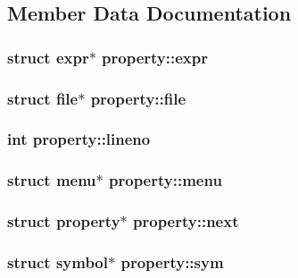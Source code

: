 \subsection{Member Data Documentation}
\hypertarget{structproperty_a1bd14e5a3072108ed7144ee002826295}{
\subsubsection[{expr}]{\setlength{\rightskip}{0pt plus 5cm}struct {\bf expr}$\ast$ property\-::expr}}\label{structproperty_a1bd14e5a3072108ed7144ee002826295}
\hypertarget{structproperty_a1a9c86981b5d72e201745eb5083d08b2}{
\subsubsection[{file}]{\setlength{\rightskip}{0pt plus 5cm}struct {\bf file}$\ast$ property\-::file}}\label{structproperty_a1a9c86981b5d72e201745eb5083d08b2}
\hypertarget{structproperty_af891a826e4d277350cd0b5f5b0f1451e}{
\subsubsection[{lineno}]{\setlength{\rightskip}{0pt plus 5cm}int property\-::lineno}}\label{structproperty_af891a826e4d277350cd0b5f5b0f1451e}
\hypertarget{structproperty_a311fc71d4d74c760073ddb383e0096c3}{
\subsubsection[{menu}]{\setlength{\rightskip}{0pt plus 5cm}struct {\bf menu}$\ast$ property\-::menu}}\label{structproperty_a311fc71d4d74c760073ddb383e0096c3}
\hypertarget{structproperty_abc7f235ce9af18a5d26baf5be06c7af7}{
\subsubsection[{next}]{\setlength{\rightskip}{0pt plus 5cm}struct {\bf property}$\ast$ property\-::next}}\label{structproperty_abc7f235ce9af18a5d26baf5be06c7af7}
\hypertarget{structproperty_aa7c9129f74d0d393543f6c2dabf5fe6d}{
\subsubsection[{sym}]{\setlength{\rightskip}{0pt plus 5cm}struct {\bf symbol}$\ast$ property\-::sym}}\label{structproperty_aa7c9129f74d0d393543f6c2dabf5fe6d}
